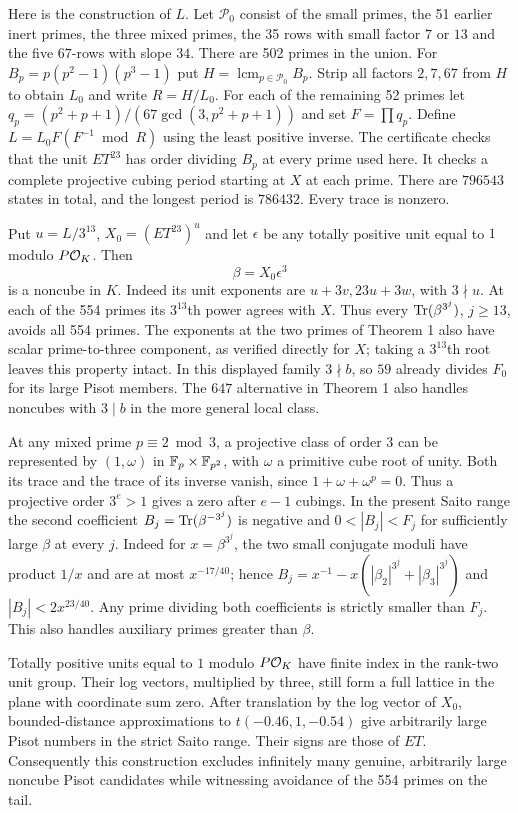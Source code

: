 \documentclass[11pt,a4paper,oneside,openany]{book}
\begin{document}
Here is the construction of $L$. Let $\mathcal P_0$ consist of the small primes, the 51 earlier inert primes, the three mixed primes, the 35 rows with small factor $7$ or $13$ and the five $67$-rows with slope $34$. There are 502 primes in the union. For $B_p=p(p^2-1)(p^3-1)$ put $H=\operatorname{lcm}_{p\in\mathcal P_0} B_p$. Strip all factors $2,7,67$ from $H$ to obtain $L_0$ and write $R=H/L_0$. For each of the remaining 52 primes let $q_p=(p^2+p+1)/(67\gcd(3,p^2+p+1))$ and set $F=\prod q_p$. Define $L=L_0 F(F^{-1}\bmod R)$ using the least positive inverse. The certificate checks that the unit $ET^{23}$ has order dividing $B_p$ at every prime used here. It checks a complete projective cubing period starting at $X$ at each prime. There are $796543$ states in total, and the longest period is $786432$. Every trace is nonzero.

 Put $u=L/3^{13}$, $X_0=(ET^{23})^u$ and let $\epsilon$ be any totally positive unit equal to $1$ modulo $P\mathcal O_K$. Then
\[
                         \beta=X_0\epsilon^3
\]
is a noncube in $K$. Indeed its unit exponents are $u+3v,23u+3w$, with $3\nmid u$. At each of the 554 primes its $3^{13}$th power agrees with $X$. Thus every $\operatorname{Tr}(\beta^{3^j})$, $j\ge13$, avoids all 554 primes. The exponents at the two primes of Theorem 1 also have scalar prime-to-three component, as verified directly for $X$; taking a $3^{13}$th root leaves this property intact. In this displayed family $3\nmid b$, so $59$ already divides $F_0$ for its large Pisot members. The $647$ alternative in Theorem 1 also handles noncubes with $3\mid b$ in the more general local class.

 At any mixed prime $p\equiv2\bmod3$, a projective class of order $3$ can be represented by $(1,\omega)$ in $\mathbb F_p\times\mathbb F_{p^2}$, with $\omega$ a primitive cube root of unity. Both its trace and the trace of its inverse vanish, since $1+\omega+\omega^p=0$. Thus a projective order $3^e>1$ gives a zero after $e-1$ cubings. In the present Saito range the second coefficient $B_j=\operatorname{Tr}(\beta^{-3^j})$ is negative and $0<|B_j|<F_j$ for sufficiently large $\beta$ at every $j$. Indeed for $x=\beta^{3^j}$, the two small conjugate moduli have product $1/x$ and are at most $x^{-17/40}$; hence $B_j=x^{-1}-x(|\beta_2|^{3^j}+|\beta_3|^{3^j})$ and $|B_j|<2x^{23/40}$. Any prime dividing both coefficients is strictly smaller than $F_j$. This also handles auxiliary primes greater than $\beta$.

 Totally positive units equal to $1$ modulo $P\mathcal O_K$ have finite index in the rank-two unit group. Their log vectors, multiplied by three, still form a full lattice in the plane with coordinate sum zero. After translation by the log vector of $X_0$, bounded-distance approximations to $t(-0.46,1,-0.54)$ give arbitrarily large Pisot numbers in the strict Saito range. Their signs are those of $ET$. Consequently this construction excludes infinitely many genuine, arbitrarily large noncube Pisot candidates while witnessing avoidance of the 554 primes on the tail.
\end{document}
